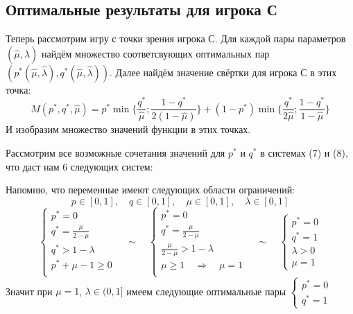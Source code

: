 \documentclass[letterpaper,12pt, reqno]{article}
\newcommand*\circled[1]{\tikz[baseline=(char.base)]{
            \node[shape=circle,draw,inner sep=2pt] (char) {#1};}}
\begin{document}
\begin{flushleft}
\section{Оптимальные результаты для игрока С}

Теперь рассмотрим игру с точки зрения игрока С. Для каждой пары параметров $(\hat\mu, \hat\lambda)$ найдём
множество соответсвующих оптимальных пар $(p^*(\hat\mu, \hat\lambda), q^*(\hat\mu, \hat\lambda))$. Далее 
найдём значение свёртки для игрока С в этих точка:
$$
M(p^*,q^*,\hat\mu)=p^*\min{\{\frac{q^*}{\hat\mu};\frac{1-q^*}{2(1-\hat\mu)}\}} +
				   (1-p^*)\min\{\frac{q^*}{2\hat\mu};\frac{1-q^*}{1-\hat\mu}\}
$$
И изобразим множество значений функции в этих точках.
\vspace{5mm}
 
Рассмотрим все возможные сочетания значений для $p^{*}$ и $q^{*}$ в системах (7) и (8), что даст нам 6 следующих систем:
\vspace{5mm}

Напомню, что переменные имеют следующих области ограничений:
\[
p \in [0, 1],\quad q \in [0, 1],\quad
\mu \in [0, 1],\quad \lambda \in [0, 1]
\]
\circled{1}%
\[
\begin{cases}
p^{*}=0 \\
q^{*}=\frac{\mu}{2-\mu} \\
q^{*}>1-\lambda \\
p^{*}+\mu-1\geq 0 \\
\end{cases}
\quad\sim\quad
\begin{cases}
p^{*}=0 \\
q^{*}=\frac{\mu}{2-\mu} \\
\frac{\mu}{2-\mu}>1-\lambda \\
\mu\geq 1 \quad\Rightarrow\quad \mu=1 \\
\end{cases}
\quad\sim\quad
\begin{cases}
p^{*}=0 \\
q^{*}=1 \\
\lambda>0 \\
\mu=1
\end{cases}
\]
Значит при $\mu=1$, $\lambda\in(0,1]$ имеем следующие оптимальные пары
$\begin{cases}p^{*}=0 \\ q^{*}=1 \end{cases}$


\end{flushleft}
\end{document}
